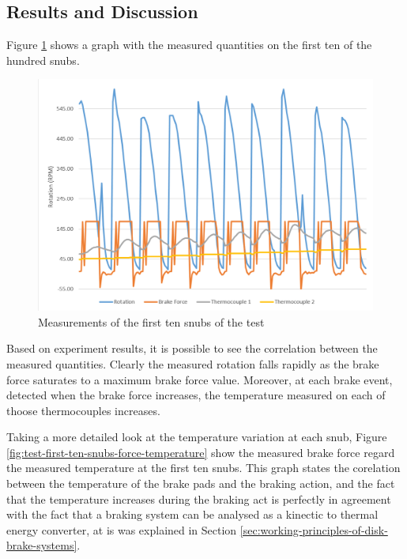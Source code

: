 	\subsection{Results and Discussion}\label{ssec:full-stop-test-results}

		Figure \ref{fig:test-first-ten-snubs} shows a graph with the measured quantities on the first ten of the hundred snubs.

		\begin{figure}[htbp]
				\centering
				\includegraphics[width=.8\textwidth]{figuras/fig-test-first-ten-snubs}
				\caption{Measurements of the first ten snubs of the test}
				\label{fig:test-first-ten-snubs}
		\end{figure}

		Based on experiment results, it is possible to see the correlation between the measured quantities. Clearly the measured rotation falls rapidly as the brake force saturates to a maximum brake force value. Moreover, at each brake event, detected when the brake force increases, the temperature measured on each of thoose thermocouples increases.
		\par

		Taking a more detailed look at the temperature variation at each snub, Figure \ref{fig:test-first-ten-snubs-force-temperature} show the measured brake force regard the measured temperature at the first ten snubs. This graph states the corelation between the temperature of the brake pads and the braking action, and the fact that the temperature increases during the braking act is perfectly in agreement with the fact that a braking system can be analysed as a kinectic to thermal energy converter, at is was explained in Section \ref{sec:working-principles-of-disk-brake-systems}.

